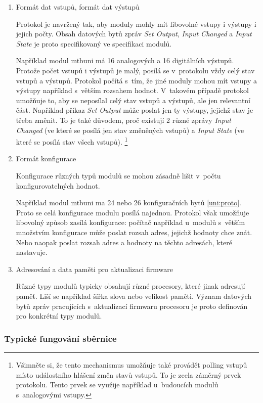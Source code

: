 \begin{enumerate}
\item Formát dat vstupů, formát dat výstupů

Protokol je navržený tak, aby moduly mohly mít libovolné vstupy i výstupy
i jejich počty. Obsah datových bytů zpráv \textit{Set Output}, \textit{Input
Changed} a \textit{Input State} je proto specifikovaný ve specifikaci modulů.

Například modul \gls{mtbuni} má 16 analogových a 16 digitálních výstupů.
Protože počet vstupů i výstupů je malý, posílá se v~protokolu vždy celý stav
vstupů a výstupů. Protokol počítá s~tím, že jiné moduly mohou mít vstupy a
výstupy například s~větším rozsahem hodnot. V~takovém případě protokol umožňuje
to, aby se neposílal celý stav vstupů a výstupů, ale jen relevantní část.
Například příkaz \textit{Set Output} může poslat jen ty výstupy, jejichž
stav je třeba změnit. To je také důvodem, proč existují 2 různé zprávy
\textit{Input Changed} (ve které se posílá jen stav změněných vstupů) a
\textit{Input State} (ve které se posílá stav všech vstupů).
\footnote{Všimněte si, že tento mechanismus umožňuje také provádět polling
vstupů místo událostního hlášení změn stavů vstupů. To je zcela záměrný prvek
protokolu. Tento prvek se využije například u~budoucích modulů s~analogovými
vstupy.}

\item Formát konfigurace

Konfigurace různých typů modulů se mohou zásadně lišit v~počtu
konfigurovatelných hodnot.

Například modul \gls{mtbuni} ma 24 nebo 26 konfiguračních bytů
\ref{uni:proto}. Proto se celá konfigurace modulu posílá najednou.  Protokol
však umožňuje libovolný způsob zasílá konfigurace: počítač například u~modulů
s~větším množstvím konfigurace může poslat rozsah adres, jejichž hodnoty chce
znát. Nebo naopak poslat rozsah adres a hodnoty na těchto adresách, které
nastavuje.

\item Adresování a data paměti pro aktualizaci firmware

Různé typy modulů typicky obsahují různé procesory, které jinak adresují paměť.
Liší se například šířka slova nebo velikost paměti. Význam datových bytů
zpráv pracujících s~aktualizací firmwaru procesoru je proto definován pro
konkrétní typy modulů.

\end{enumerate}

\subsubsection{Typické fungování sběrnice}

